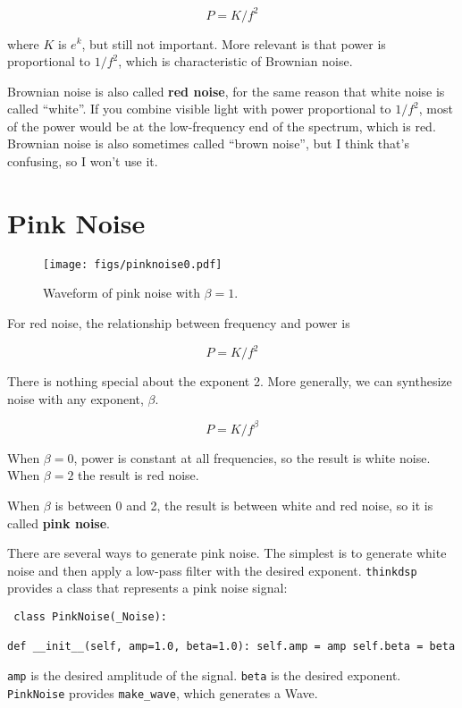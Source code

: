 \documentclass[12pt]{book} \usepackage[width=5.5in,height=8.5in, hmarginratio=3:2,vmarginratio=1:1]{geometry}
\begin{document}
%
\[ P = K / f^{2} \] 

%
where $K$ is $e^k$, but still not important. More relevant is that power is proportional to $1/f^2$, which is characteristic of Brownian noise. 

Brownian noise is also called {\bf red noise}, for the same reason that white noise is called ``white''. If you combine visible light with power proportional to $1/f^2$, most of the power would be at the low-frequency end of the spectrum, which is red. Brownian noise is also sometimes called ``brown noise'', but I think that's confusing, so I won't use it. 

\section{Pink Noise} \label{pink} 

\begin{figure} 

\centerline{\texttt{[image: figs/pinknoise0.pdf]}} \caption{Waveform of pink noise with $\beta=1$.} \label{fig.pinknoise0} \end{figure} 

For red noise, the relationship between frequency and power is 

%
\[ P = K / f^{2} \] 

%
There is nothing special about the exponent 2. More generally, we can synthesize noise with any exponent, $\beta$. 

%
\[ P = K / f^{\beta} \] 

%
When $\beta = 0$, power is constant at all frequencies, so the result is white noise. When $\beta=2$ the result is red noise. 

When $\beta$ is between 0 and 2, the result is between white and red noise, so it is called {\bf pink noise}. 

There are several ways to generate pink noise. The simplest is to generate white noise and then apply a low-pass filter with the desired exponent. {\tt thinkdsp} provides a class that represents a pink noise signal: 

\begin{verbatim} class PinkNoise(_Noise): 

def __init__(self, amp=1.0, beta=1.0): self.amp = amp self.beta = beta \end{verbatim} 

{\tt amp} is the desired amplitude of the signal. {\tt beta} is the desired exponent. {\tt PinkNoise} provides \verb"make_wave", which generates a Wave. 
\end{document}
